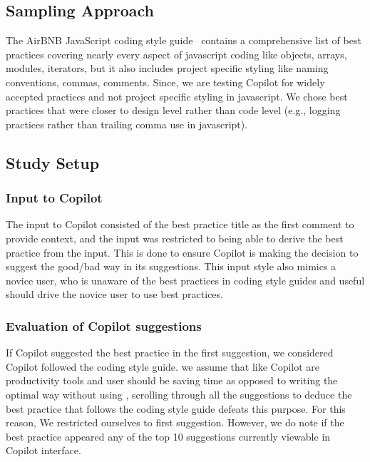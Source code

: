 \subsection{Sampling Approach}
\label{smells:sampling}
The AirBNB JavaScript coding style guide~\cite{airbnb_code} contains a comprehensive list of best practices covering nearly every aspect of javascript coding like objects, arrays, modules, iterators, but it also includes project specific styling like naming conventions, commas, comments.
Since, we are testing Copilot for widely accepted practices and not project specific styling in javascript. We chose best practices that were closer to design level rather than code level (e.g., logging practices rather than trailing comma use in javascript). 

\subsection{Study Setup}

\subsubsection{Input to Copilot}
\label{smells:input}
The input to Copilot consisted of the best practice title as the first comment to provide context, and the input was restricted to being able to derive the best practice from the input. This is done to ensure Copilot is making the decision to suggest the good/bad way in its suggestions. This input style also mimics a novice user, who is unaware of the best practices in coding style guides and useful \cct{} should drive the novice user to use best practices.

\subsubsection{Evaluation of Copilot suggestions}
\label{smells:evaluation}
If Copilot suggested the best practice in the first suggestion, we considered Copilot followed the coding style guide. we assume that \cct{} like Copilot are productivity tools and user should be saving time as opposed to writing the optimal way without using \cct{}, scrolling through all the suggestions to deduce the best practice that follows the coding style guide defeats this purpose. 
For this reason, We restricted ourselves to first suggestion. However, we do note if the best practice appeared any of the top 10 suggestions currently viewable in Copilot interface. 


